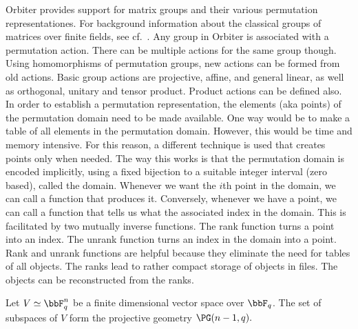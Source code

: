 Orbiter provides support for matrix groups and their various permutation representationes. 
For background information about the classical groups of matrices over finite fields, see cf.~\cite{Taylor1992}. 
Any group in Orbiter is associated with a permutation action. 
There can be multiple actions for the same group though.
Using homomorphisms of permutation groups, new actions can be formed from old actions. 
Basic group actions are  projective, affine, and general linear, as well as orthogonal, unitary and tensor product. 
Product actions can be defined also.
In order to establish a permutation representation, the elements (aka points) of the permutation domain 
need to be made available. One way would be to make a table of all elements in the permutation domain. 
However, this would be time and memory intensive. For this reason, a different technique is used that 
creates points only when needed. The way this works is that the permutation domain is encoded implicitly, 
using a fixed bijection to a suitable integer interval (zero based), called the domain. 
Whenever we want the $i$th point in the domain, we can call a function that produces it. 
Conversely, whenever we have a point, we can call a function that tells us what the associated index in the domain.
This is facilitated by two mutually inverse functions. 
The rank function turns a point into an index. 
The unrank function turns an index in the domain into a point. 
Rank and unrank functions are helpful because they eliminate the need for tables of all objects. 
The ranks lead to rather compact storage of objects in files. The objects can be reconstructed from the ranks.


\bigskip

Let $V \simeq \bbF_q^n$
be a finite dimensional vector space over $\bbF_q$. 
The set of subspaces of $V$ form the projective geometry $\PG(n-1,q).$

\bigskip

